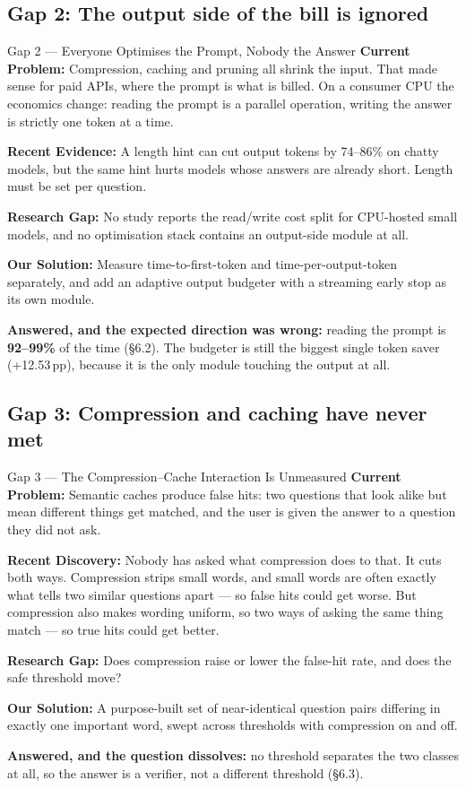 \documentclass[11pt,a4paper]{article}
\newcommand{\lbl}[1]{\textcolor{accent}{\textbf{#1}}}
\begin{document}
\subsection{Gap 2: The output side of the bill is ignored}
\begin{gap}{Gap 2 --- Everyone Optimises the Prompt, Nobody the Answer}
\lbl{Current Problem:} Compression, caching and pruning all shrink the input. That
made sense for paid APIs, where the prompt is what is billed. On a consumer CPU the
economics change: reading the prompt is a parallel operation, writing the answer is
strictly one token at a time.

\lbl{Recent Evidence:} A length hint can cut output tokens by 74--86\% on chatty
models, but the same hint hurts models whose answers are already short. Length must
be set per question.

\lbl{Research Gap:} No study reports the read/write cost split for CPU-hosted small
models, and no optimisation stack contains an output-side module at all.

\lbl{Our Solution:} Measure time-to-first-token and time-per-output-token separately,
and add an adaptive output budgeter with a streaming early stop as its own module.
\end{gap}
\textbf{Answered, and the expected direction was wrong:} reading the prompt is
\textbf{92--99\%} of the time (\S6.2). The budgeter is still the biggest single token
saver (+12.53\,pp), because it is the only module touching the output at all.

\subsection{Gap 3: Compression and caching have never met}
\begin{gap}{Gap 3 --- The Compression--Cache Interaction Is Unmeasured}
\lbl{Current Problem:} Semantic caches produce false hits: two questions that look
alike but mean different things get matched, and the user is given the answer to a
question they did not ask.

\lbl{Recent Discovery:} Nobody has asked what compression does to that. It cuts both
ways. Compression strips small words, and small words are often exactly what tells
two similar questions apart --- so false hits could get worse. But compression also
makes wording uniform, so two ways of asking the same thing match --- so true hits
could get better.

\lbl{Research Gap:} Does compression raise or lower the false-hit rate, and does the
safe threshold move?

\lbl{Our Solution:} A purpose-built set of near-identical question pairs differing in
exactly one important word, swept across thresholds with compression on and off.
\end{gap}
\textbf{Answered, and the question dissolves:} no threshold separates the two classes
at all, so the answer is a verifier, not a different threshold (\S6.3).
\end{document}
